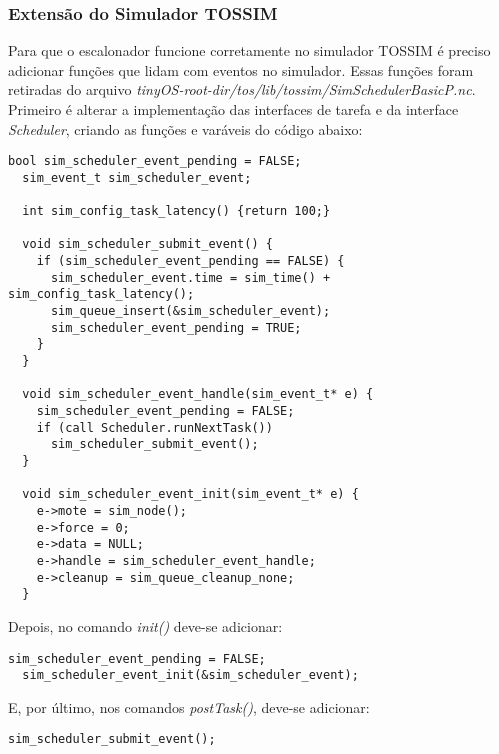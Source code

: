 \subsubsection{Extensão do Simulador TOSSIM}
Para que o escalonador funcione corretamente no simulador TOSSIM é preciso adicionar funções que lidam com eventos no
simulador. Essas funções foram retiradas do arquivo
\textit{tinyOS-root-dir/tos/lib/tossim/SimSchedulerBasicP.nc}.
Primeiro é alterar a implementação das interfaces de tarefa e da interface \textit{Scheduler}, criando as funções e varáveis do código abaixo:
\begin{lstlisting}[frame=single]
  bool sim_scheduler_event_pending = FALSE;
  sim_event_t sim_scheduler_event;

  int sim_config_task_latency() {return 100;}

  void sim_scheduler_submit_event() {
    if (sim_scheduler_event_pending == FALSE) {
      sim_scheduler_event.time = sim_time() + sim_config_task_latency();
      sim_queue_insert(&sim_scheduler_event);
      sim_scheduler_event_pending = TRUE;
    }
  }

  void sim_scheduler_event_handle(sim_event_t* e) {
    sim_scheduler_event_pending = FALSE;
    if (call Scheduler.runNextTask()) 
      sim_scheduler_submit_event();
  }

  void sim_scheduler_event_init(sim_event_t* e) {
    e->mote = sim_node();
    e->force = 0;
    e->data = NULL;
    e->handle = sim_scheduler_event_handle;
    e->cleanup = sim_queue_cleanup_none;
  }
\end{lstlisting}

Depois, no comando \textit{init()} deve-se adicionar:
\begin{lstlisting}[frame=single]
  sim_scheduler_event_pending = FALSE;
  sim_scheduler_event_init(&sim_scheduler_event);
\end{lstlisting}
E, por último, nos comandos \textit{postTask()}, deve-se adicionar:
\begin{lstlisting}[frame=single]
  sim_scheduler_submit_event();
\end{lstlisting}

